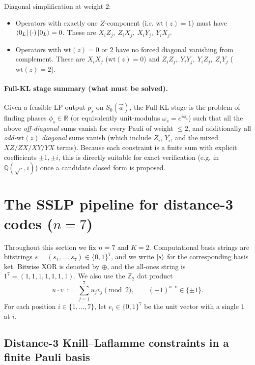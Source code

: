 \documentclass[11pt]{article}
\begin{document}
Diagonal simplification at weight \(2\):
\begin{itemize}
\item Operators with exactly one \(Z\)-component (i.e. \(\mathrm{wt}(z)=1\)) must have
\(\bra{0_L}(\cdot)\ket{0_L}=0\).
These are \(X_iZ_j,\ Z_iX_j,\ X_iY_j,\ Y_iX_j\).
\item Operators with \(\mathrm{wt}(z)=0\) or \(2\) have no forced diagonal vanishing from complement.
These are \(X_iX_j\) (\(\mathrm{wt}(z)=0\)) and \(Z_iZ_j,\ Y_iY_j,\ Y_iZ_j,\ Z_iY_j\) (\(\mathrm{wt}(z)=2\)).
\end{itemize}

\paragraph{Full-KL stage summary (what must be solved).}
Given a feasible LP output \(p_s\) on \(S_0(\vec a)\), the Full-KL stage is the problem of finding phases
\(\phi_s\in\mathbb{R}\) (or equivalently unit-modulus \(\omega_s=e^{i\phi_s}\)) such that all the above
\emph{off-diagonal} sums vanish for every Pauli of weight \(\le 2\), and additionally all \emph{odd-\(\mathrm{wt}(z)\)}
\emph{diagonal} sums vanish (which include \(Z_i\), \(Y_i\), and the mixed \(XZ/ZX/XY/YX\) terms).
Because each constraint is a finite sum with explicit coefficients \(\pm 1,\pm i\), this is directly suitable
for exact verification (e.g. in \(\mathbb{Q}(\sqrt{\cdot},i)\)) once a candidate closed form is proposed.

\section{The SSLP pipeline for distance-3 codes (\(n=7\))}

Throughout this section we fix \(n=7\) and \(K=2\). Computational basis strings are bitstrings
\(s=(s_1,\dots,s_7)\in\{0,1\}^7\), and we write \(\ket{s}\) for the corresponding basis ket.
Bitwise XOR is denoted by \(\oplus\), and the all-ones string is \(1^7=(1,1,1,1,1,1,1)\).
We also use the \(\mathbb{Z}_2\) dot product
\[
u\cdot v \ :=\ \sum_{j=1}^7 u_j v_j \pmod 2,
\qquad
(-1)^{u\cdot v}\in\{\pm 1\}.
\]
For each position \(i\in\{1,\dots,7\}\), let \(e_i\in\{0,1\}^7\) be the unit vector with a single \(1\) at \(i\).

\subsection{Distance-3 Knill--Laflamme constraints in a finite Pauli basis}
\end{document}
